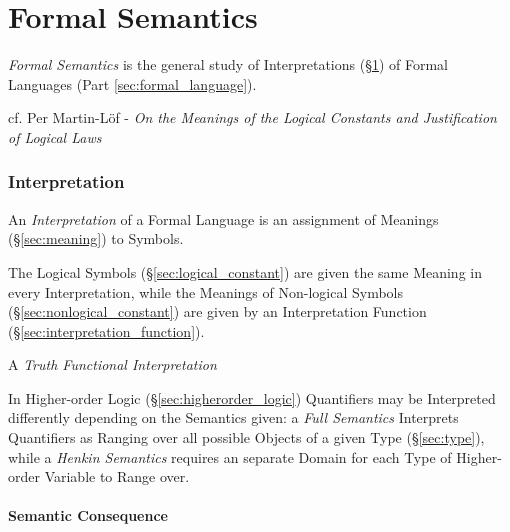 \part{Formal Semantics}\label{part:formal_semantics}

\emph{Formal Semantics} is the general study of Interpretations
(\S\ref{sec:interpretation}) of Formal Languages (Part
\ref{sec:formal_language}).

cf. Per Martin-L\"of - \emph{On the Meanings of the Logical Constants and
  Justification of Logical Laws}



\section{Interpretation}\label{sec:interpretation}

An \emph{Interpretation} of a Formal Language is an assignment of
Meanings (\S\ref{sec:meaning}) to Symbols.

The Logical Symbols (\S\ref{sec:logical_constant}) are given the same
Meaning in every Interpretation, while the Meanings of Non-logical
Symbols (\S\ref{sec:nonlogical_constant}) are given by an Interpretation
Function (\S\ref{sec:interpretation_function}).

A \emph{Truth Functional Interpretation}

In Higher-order Logic (\S\ref{sec:higherorder_logic}) Quantifiers may
be Interpreted differently depending on the Semantics given: a
\emph{Full Semantics} Interprets Quantifiers as Ranging over all
possible Objects of a given Type (\S\ref{sec:type}), while a
\emph{Henkin Semantics} requires an separate Domain for each Type of
Higher-order Variable to Range over.



\subsection{Semantic Consequence}\label{sec:semantic_consequence}

